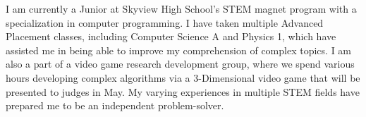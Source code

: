 


I am currently a Junior at Skyview High School’s STEM magnet 
program with a specialization in computer programming. 
I have taken multiple Advanced Placement classes, including 
Computer Science A and Physics 1, which have assisted me 
in being able to improve my comprehension of complex topics. 
I am also a part of a video game research development group, 
where we spend various hours developing complex algorithms 
via a 3-Dimensional video game that will be presented to 
judges in May. My varying experiences in multiple STEM fields 
have prepared me to be an independent problem-solver.

